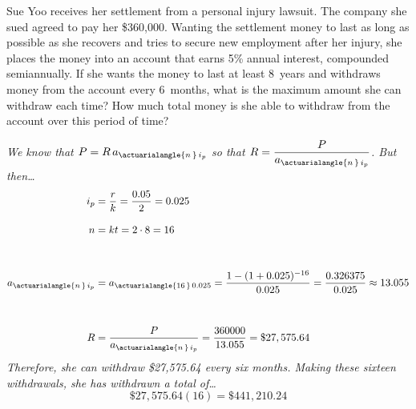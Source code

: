 \documentclass[12pt,letterpaper]{exam}
\begin{document}
\begin{questions}



\newpage
\question[10] Sue Yoo receives her settlement from a personal injury lawsuit. The company she sued agreed to pay her \$360,000. Wanting the settlement money to last as long as possible as she recovers and tries to secure new employment after her injury, she places the money into an account that earns 5\% annual interest, compounded semiannually. If she wants the money to last at least 8~years and withdraws money from the account every 6~months, what is the maximum amount she can withdraw each time? How much total money is she able to withdraw from the account over this period of time? \pvspace{1cm}

{\itshape We know that $P= R\,a_{\actuarialangle{n\,}\, i_p}$ so that $R= \dfrac{P}{a_{\actuarialangle{n\,}\, i_p}}$. But then\dots
	\[
	\begin{aligned}
	i_p&= \dfrac{r}{k}= \dfrac{0.05}{2}= 0.025 \\[0.3cm]
	n&= kt= 2 \cdot 8= 16 \\[1cm]
	a_{\actuarialangle{n\,}\, i_p}&= a_{\actuarialangle{16\,}\, 0.025}= \dfrac{1 - (1 + 0.025)^{-16}}{0.025}= \dfrac{0.326375}{0.025} \approx 13.055 \\[1cm]
	R&= \dfrac{P}{a_{\actuarialangle{n\,}\, i_p}}= \dfrac{360000}{13.055}= \$27,575.64
	\end{aligned}
	\] \pspace
Therefore, she can withdraw  \$27,575.64 every six months. Making these sixteen withdrawals, she has withdrawn a total of\dots \pspace
	\[
	\$27,575.64(16)= \$441,210.24
	\]
}




\end{questions}
\end{document}
